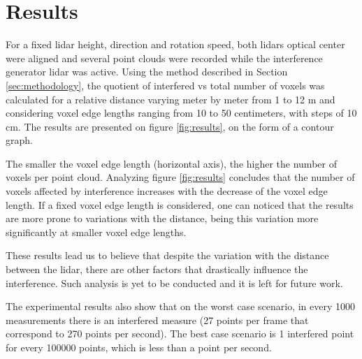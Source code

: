 \documentclass[extendedabs]{recpad2k}
\begin{document}



\section{Results}
For a fixed \gls{lidar} height, direction and rotation speed, both \gls{lidar}s optical center were aligned and several point clouds were recorded while the interference generator \gls{lidar} was active. Using the method described in Section \ref{sec:methodology}, the quotient of interfered vs total number of voxels was calculated for a relative distance varying meter by meter from 1 to 12 m and considering voxel edge lengths ranging from 10 to 50 centimeters, with steps of 10 cm. The results are presented on figure \ref{fig:results}, on the form of a contour graph. 

The smaller the voxel edge length (horizontal axis), the higher the number of voxels per point cloud. Analyzing figure \ref{fig:results} concludes that the number of voxels affected by interference increases with the decrease of the voxel edge length. If a fixed voxel edge length is considered, one can noticed that the results are more prone to variations with the distance, being this variation more significantly at smaller voxel edge lengths.


These results lead us to believe that despite the variation with the distance between the \gls{lidar}, there are other factors that drastically influence the interference. Such analysis is yet to be conducted and it is left for future work.

The experimental results also show that on the worst case scenario, in every 1000 measurements there is an interfered measure (27 points per frame that correspond to 270 points per second). The best case scenario is 1 interfered point for every 100000 points, which is less than a point per second.
\end{document}
